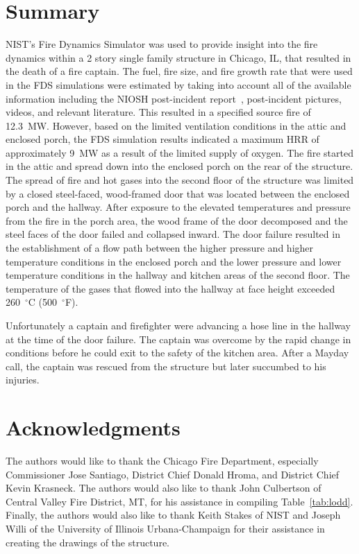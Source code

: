 \documentclass[12pt,oneside]{book}
\begin{document}
\chapter{Summary}
NIST's Fire Dynamics Simulator was used to provide insight into the fire dynamics within a 2  story single family structure in Chicago, IL, that resulted in the death of a fire captain. The fuel, fire size, and fire growth rate that were used in the FDS simulations were estimated by taking into account all of the available information including the NIOSH post-incident report~\cite{NIOSH:Bowyer}, post-incident pictures, videos, and relevant literature. This resulted in a specified source fire of 12.3~MW. However, based on the limited ventilation conditions in the attic and enclosed porch, the FDS simulation results indicated a maximum HRR of approximately 9~MW as a result of the limited supply of oxygen.  The fire started in the attic and spread down into the enclosed porch on the rear of the structure.  The spread of fire and hot gases into the second floor of the structure was limited by a closed steel-faced, wood-framed door that was located between the enclosed porch and the hallway.  After exposure to the elevated temperatures and pressure from the fire in the porch area, the wood frame of the door decomposed and the steel faces of the door failed and collapsed inward.  The door failure resulted in the establishment of a flow path between the higher pressure and higher temperature conditions in the enclosed porch and the lower pressure and lower temperature conditions in the hallway and kitchen areas of the second floor.  The temperature of the gases that flowed into the hallway at face height exceeded 260~$^{\circ}$C (500~$^{\circ}$F). 

Unfortunately a captain and firefighter were advancing a hose line in the hallway at the time of the door failure.  The captain was overcome by the rapid change in conditions before he could exit to the safety of the kitchen area.  After a Mayday call, the captain was rescued from the structure but later succumbed to his injuries.


\chapter{Acknowledgments}
The authors would like to thank the Chicago Fire Department, especially Commissioner Jose Santiago, District Chief Donald Hroma, and District Chief Kevin Krasneck. The authors would also like to thank John Culbertson of Central Valley Fire District, MT, for his assistance in compiling Table~\ref{tab:lodd}. Finally, the authors would also like to thank Keith Stakes of NIST and Joseph Willi of the University of Illinois Urbana-Champaign for their assistance in creating the drawings of the structure.
\end{document}
